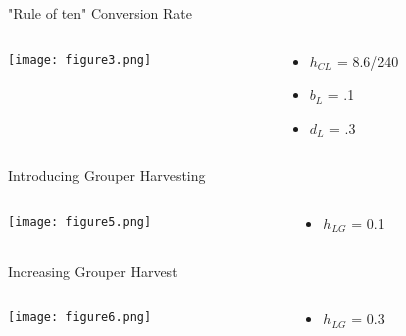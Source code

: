 \documentclass{beamer}
\begin{document}
\begin{frame}{"Rule of ten"  Conversion Rate}
\begin{columns}[t]
\begin{column}[T]{8cm}
\texttt{[image: figure3.png]}
\end{column}
\begin{column}[T]{3cm}
\begin{itemize}

\item $h_{CL}$ = 8.6/240

\item $b_{L}$ = .1

\item $d_{L}$ = .3


\end{itemize}
\end{column}
\end{columns}
\end{frame}


\begin{frame}{Introducing Grouper Harvesting}
\begin{columns}[t]
\begin{column}[T]{8cm}
\texttt{[image: figure5.png]}
\end{column}
\begin{column}[T]{3cm}
\begin{itemize}

\item $h_{LG}$ = 0.1



\end{itemize}
\end{column}
\end{columns}
\end{frame}

\begin{frame}{Increasing Grouper Harvest}
\begin{columns}[t]
\begin{column}[T]{8cm}
\texttt{[image: figure6.png]}
\end{column}
\begin{column}[T]{3cm}
\begin{itemize}

\item $h_{LG}$ = 0.3



\end{itemize}
\end{column}
\end{columns}
\end{frame}
\end{document}
